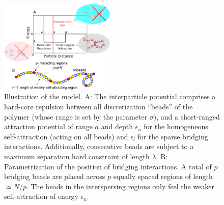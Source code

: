 \documentclass[
preprint,
a4paper,
12pt,
superscriptaddress,
pre]{revtex4}
\begin{document}
\begin{figure}
  \centering
 \includegraphics[width=0.49\textwidth]{fig1}
 \caption{Illustration of the model. A: The interparticle potential
   comprises a hard-core repulsion between all discretization
   ``beads'' of the polymer (whose range is set by the parameter
   $\sigma$), and a short-ranged attraction potential of range
   $a$ and depth $\epsilon_u$ for the homogeneous self-attraction
   (acting on all beads) and $\epsilon_l$ for the sparse bridging
   interactions. Additionally, consecutive beads are subject to a
   maximum separation hard constraint of length $\lambda$.
   B: Parametrization of the position of bridging interactions. A
   total of $p$ bridging beads are placed across $p$ equally spaced
   regions of length $\simeq N /p$. The beads in the interspersing
   regions only feel the weaker self-attraction of energy
   $\epsilon_u$. }
  \label{fig:1}
\end{figure}
\end{document}
